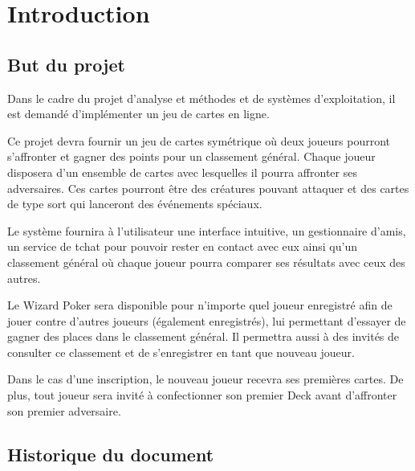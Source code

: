 \documentclass[11pt,a4paper]{article}
\begin{document}

\pagestyle{empty}
\tableofcontents
\newpage
\pagestyle{fancy}

\setcounter{page}{1}

\section{Introduction}
\label{sec:intro}

\subsection{But du projet}
\label{sec:but}

Dans le cadre du projet d'analyse et méthodes et de systèmes
d'exploitation, il est demandé d'implémenter un jeu de cartes en ligne.

\medbreak

Ce projet devra fournir un jeu de cartes symétrique où deux joueurs
pourront s'affronter et gagner des points pour un classement
général. Chaque joueur disposera d'un ensemble de cartes avec lesquelles
il pourra affronter ses adversaires. Ces cartes pourront être des
créatures pouvant attaquer et des cartes de type
sort qui lanceront des événements spéciaux.

\medbreak

Le système fournira à l'utilisateur une interface intuitive, un gestionnaire
d'amis, un service de tchat pour pouvoir rester en contact avec eux ainsi
qu'un classement général où chaque joueur pourra comparer ses résultats avec
ceux des autres.

\medbreak

Le Wizard Poker sera disponible pour n'importe quel joueur enregistré
afin de jouer contre d'autres joueurs (également enregistrés), lui
permettant d'essayer de gagner des places dans le classement
général. Il permettra aussi à des invités de consulter ce classement
et de s'enregistrer en tant que nouveau joueur.

\medbreak

Dans le cas d'une inscription, le nouveau joueur recevra ses premières
cartes. De plus, tout joueur sera invité à confectionner son premier
Deck avant d'affronter son premier adversaire.

\subsection{Historique du document}
\label{sec:hist}
\end{document}
